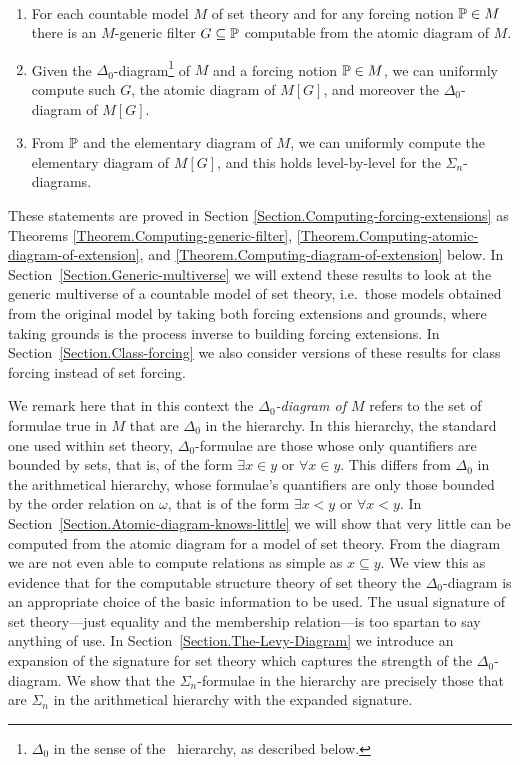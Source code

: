 \documentclass{amsart}
\begin{document}
\begin{maintheorem}\label{MainTheorem}\
  \begin{enumerate}
    \item
    For each countable model $M$ of set theory and for any forcing notion $\P\in M$
    there is an $M$-generic filter $G\of\P$ computable from the atomic diagram of $M$.
    \item Given the $\Delta_0$-diagram\footnote{$\Delta_0$ in the sense of the \Levy\ hierarchy, as described below.} of $M$ and a forcing notion $\P\in M$, we can uniformly compute such $G$, the atomic diagram of $M[G]$, and moreover the $\Delta_0$-diagram of $M[G]$.
    \item From $\P$ and the elementary diagram of $M$, we can uniformly compute the elementary diagram of $M[G]$, and this holds level-by-level for the $\Sigma_n$-diagrams.
  \end{enumerate}
\end{maintheorem}

\noindent These statements are proved in Section \ref{Section.Computing-forcing-extensions} as Theorems \ref{Theorem.Computing-generic-filter}, \ref{Theorem.Computing-atomic-diagram-of-extension}, and \ref{Theorem.Computing-diagram-of-extension} below. In Section~\ref{Section.Generic-multiverse} we will extend these results to look at the generic multiverse of a countable model of set theory, i.e.\ those models obtained from the original model by taking both forcing extensions and grounds, where taking grounds is the process inverse to building forcing extensions.  In Section~\ref{Section.Class-forcing} we also consider versions of these results for class forcing instead of set forcing.

We remark here that in this context the \emph{$\Delta_0$-diagram of $M$} refers to the set of formulae true in $M$ that are $\Delta_0$ in the \Levy{} hierarchy. In this hierarchy, the standard one used within set theory, $\Delta_0$-formulae are those whose only quantifiers are bounded by sets, that is, of the form $\exists x \in y$ or $\forall x \in y$. This differs from $\Delta_0$ in the arithmetical hierarchy, whose formulae's quantifiers are only those bounded by the order relation on $\omega$, that is of the form $\exists x < y$ or $\forall x < y$. In Section~\ref{Section.Atomic-diagram-knows-little} we will show that very little can be computed from the atomic diagram for a model of set theory. From the diagram we are not even able to compute relations as simple as $x \subseteq y$. We view this as evidence that for the computable structure theory of set theory the \Levy{} $\Delta_0$-diagram is an appropriate choice of the basic information to be used. The usual signature of set theory---just equality and the membership relation---is too spartan to say anything of use. In Section~\ref{Section.The-Levy-Diagram} we introduce an expansion of the signature for set theory which captures the strength of the \Levy{} $\Delta_0$-diagram. We show that the $\Sigma_n$-formulae in the \Levy{} hierarchy are precisely those that are $\Sigma_n$ in the arithmetical hierarchy with the expanded signature.
\end{document}
